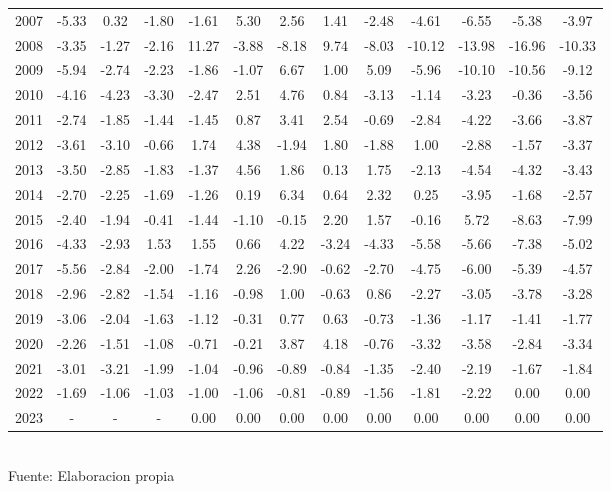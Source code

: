 \documentclass{article} %
\begin{document}
\begin{table}[H]
{\begin{tabular}{|c|c|c|c|c|c|c|c|c|c|c|c|c|}
        2007 & -5.33 & 0.32 & -1.80 & -1.61 & 5.30 & 2.56 & 1.41 & -2.48 & -4.61 & -6.55 & -5.38 & -3.97 \\
        2008 & -3.35 & -1.27 & -2.16 & 11.27 & -3.88 & -8.18 & 9.74 & -8.03 & -10.12 & -13.98 & -16.96 & -10.33 \\
        2009 & -5.94 & -2.74 & -2.23 & -1.86 & -1.07 & 6.67 & 1.00 & 5.09 & -5.96 & -10.10 & -10.56 & -9.12 \\
        2010 & -4.16 & -4.23 & -3.30 & -2.47 & 2.51 & 4.76 & 0.84 & -3.13 & -1.14 & -3.23 & -0.36 & -3.56 \\
        2011 & -2.74 & -1.85 & -1.44 & -1.45 & 0.87 & 3.41 & 2.54 & -0.69 & -2.84 & -4.22 & -3.66 & -3.87 \\
        2012 & -3.61 & -3.10 & -0.66 & 1.74 & 4.38 & -1.94 & 1.80 & -1.88 & 1.00 & -2.88 & -1.57 & -3.37 \\
        2013 & -3.50 & -2.85 & -1.83 & -1.37 & 4.56 & 1.86 & 0.13 & 1.75 & -2.13 & -4.54 & -4.32 & -3.43 \\
        2014 & -2.70 & -2.25 & -1.69 & -1.26 & 0.19 & 6.34 & 0.64 & 2.32 & 0.25 & -3.95 & -1.68 & -2.57 \\
        2015 & -2.40 & -1.94 & -0.41 & -1.44 & -1.10 & -0.15 & 2.20 & 1.57 & -0.16 & 5.72 & -8.63 & -7.99 \\
        2016 & -4.33 & -2.93 & 1.53 & 1.55 & 0.66 & 4.22 & -3.24 & -4.33 & -5.58 & -5.66 & -7.38 & -5.02 \\
        2017 & -5.56 & -2.84 & -2.00 & -1.74 & 2.26 & -2.90 & -0.62 & -2.70 & -4.75 & -6.00 & -5.39 & -4.57 \\
        2018 & -2.96 & -2.82 & -1.54 & -1.16 & -0.98 & 1.00 & -0.63 & 0.86 & -2.27 & -3.05 & -3.78 & -3.28 \\
        2019 & -3.06 & -2.04 & -1.63 & -1.12 & -0.31 & 0.77 & 0.63 & -0.73 & -1.36 & -1.17 & -1.41 & -1.77 \\
        2020 & -2.26 & -1.51 & -1.08 & -0.71 & -0.21 & 3.87 & 4.18 & -0.76 & -3.32 & -3.58 & -2.84 & -3.34 \\
        2021 & -3.01 & -3.21 & -1.99 & -1.04 & -0.96 & -0.89 & -0.84 & -1.35 & -2.40 & -2.19 & -1.67 & -1.84 \\
        2022 & -1.69 & -1.06 & -1.03 & -1.00 & -1.06 & -0.81 & -0.89 & -1.56 & -1.81 & -2.22 & 0.00 & 0.00 \\
        2023 & - & - & - & 0.00 & 0.00 & 0.00 & 0.00 & 0.00 & 0.00 & 0.00 & 0.00 & 0.00 \\
    \hline
    \end{tabular}%
    }
    \label{tab:precipitaciones_promedio}
    \vspace{0.2cm}
    \\Fuente: Elaboracion propia
\end{table}
\end{document}
